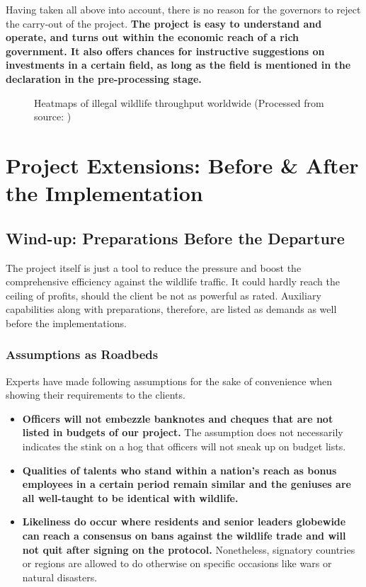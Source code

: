 \documentclass[12pt]{article}
\begin{document}
Having taken all above into account, there is no reason for the governors to reject the carry-out of the project. \textbf{The project is easy to understand and operate, and turns out within the economic reach of a rich government. It also offers chances for instructive suggestions on investments in a certain field, as long as the field is mentioned in the declaration in the pre-processing stage.}

\begin{figure}[htbp]
	\centering
{}
	\caption{Heatmaps of illegal wildlife throughput worldwide (Processed from source: \cite{3})}
\end{figure}

\section{Project Extensions: Before \& After the Implementation}

\subsection{Wind-up: Preparations Before the Departure}

The project itself is just a tool to reduce the pressure and boost the comprehensive efficiency against the wildlife traffic. It could hardly reach the ceiling of profits, should the client be not as powerful as rated. Auxiliary capabilities along with preparations, therefore, are listed as demands as well before the implementations.
\subsubsection{Assumptions as Roadbeds}

Experts have made following assumptions for the sake of convenience when showing their requirements to the clients.

\begin{itemize}
	\item \textbf{Officers will not embezzle banknotes and cheques that are not listed in budgets of our project.} The assumption does not necessarily indicates the stink on a hog that officers will not sneak up on budget lists.
	\item \textbf{Qualities of talents who stand within a nation's reach as bonus employees in a certain period remain similar and the geniuses are all well-taught to be identical with wildlife.}
	\item \textbf{Likeliness do occur where residents and senior leaders globewide can reach a consensus on bans against the wildlife trade and will not quit after signing on the protocol.} Nonetheless, signatory countries or regions are allowed to do otherwise on specific occasions like wars or natural disasters.
\end{itemize}
\end{document}

